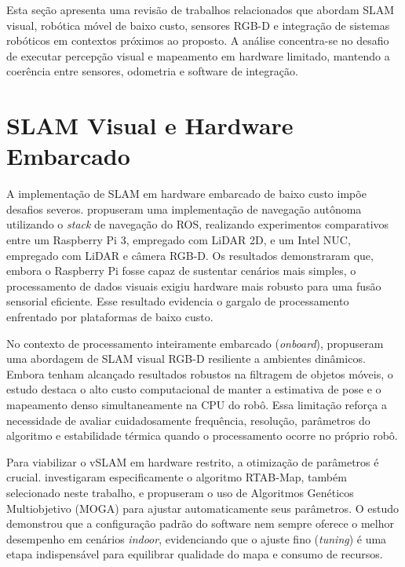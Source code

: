 Esta seção apresenta uma revisão de trabalhos relacionados que abordam SLAM visual, robótica móvel de baixo custo, sensores RGB-D e integração de sistemas robóticos em contextos próximos ao proposto. A análise concentra-se no desafio de executar percepção visual e mapeamento em hardware limitado, mantendo a coerência entre sensores, odometria e software de integração.

\section{SLAM Visual e Hardware Embarcado}

A implementação de SLAM em hardware embarcado de baixo custo impõe desafios severos.  propuseram uma implementação de navegação autônoma utilizando o \textit{stack} de navegação do ROS, realizando experimentos comparativos entre um Raspberry Pi 3, empregado com LiDAR 2D, e um Intel NUC, empregado com LiDAR e câmera RGB-D. Os resultados demonstraram que, embora o Raspberry Pi fosse capaz de sustentar cenários mais simples, o processamento de dados visuais exigiu hardware mais robusto para uma fusão sensorial eficiente. Esse resultado evidencia o gargalo de processamento enfrentado por plataformas de baixo custo.

No contexto de processamento inteiramente embarcado (\textit{onboard}),  propuseram uma abordagem de SLAM visual RGB-D resiliente a ambientes dinâmicos. Embora tenham alcançado resultados robustos na filtragem de objetos móveis, o estudo destaca o alto custo computacional de manter a estimativa de pose e o mapeamento denso simultaneamente na CPU do robô. Essa limitação reforça a necessidade de avaliar cuidadosamente frequência, resolução, parâmetros do algoritmo e estabilidade térmica quando o processamento ocorre no próprio robô.

Para viabilizar o vSLAM em hardware restrito, a otimização de parâmetros é crucial.  investigaram especificamente o algoritmo RTAB-Map, também selecionado neste trabalho, e propuseram o uso de Algoritmos Genéticos Multiobjetivo (MOGA) para ajustar automaticamente seus parâmetros. O estudo demonstrou que a configuração padrão do software nem sempre oferece o melhor desempenho em cenários \textit{indoor}, evidenciando que o ajuste fino (\textit{tuning}) é uma etapa indispensável para equilibrar qualidade do mapa e consumo de recursos.

